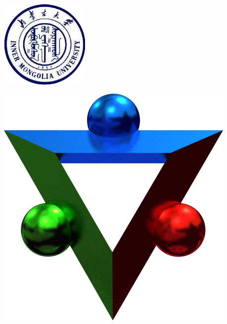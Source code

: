 \\[\intextsep] 
    \begin{minipage}{0.5\textwidth} 
        \centering
        \includegraphics{figure/emblem.png}
        \label{fig:emblem} 
    \end{minipage}
    \begin{minipage}{0.5\textwidth} 
        \centering
        \includegraphics{figure/imudges.png}
        \label{fig:emblem} 
    \end{minipage}
\\[\intextsep] 